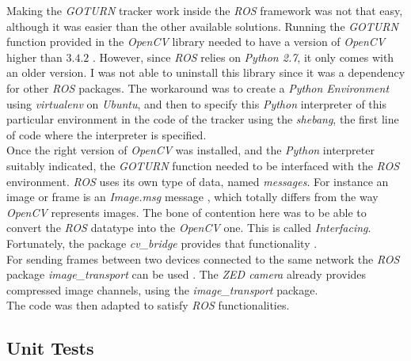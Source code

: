 		Making the \textit{GOTURN} tracker work inside
		the \textit{ROS} framework was not that easy, 
		although it was easier than the other available solutions.
		Running the \textit{GOTURN} function provided 
		in the \textit{OpenCV} library needed 
		to have a version of \textit{OpenCV} higher than $3.4.2$ \cite{learnopencvgoturn}.
		However, since
		\textit{ROS} relies on \textit{Python 2.7}, 
		it only comes with an older version. I was not
		able to uninstall this library since it was
		a dependency for other \textit{ROS} packages. The 
		workaround was to create a \textit{Python Environment}
		using \textit{virtualenv} on \textit{Ubuntu}, and then 
		to specify this \textit{Python} interpreter of this
		particular environment in the code of the tracker
		using the \textit{shebang}, the first line of code
		where the interpreter is specified.
		\\\indent Once the right version of
		\textit{OpenCV} was installed, and the \textit{Python}
		interpreter suitably indicated, the \textit{GOTURN} function
		needed to be interfaced with the \textit{ROS} environment.
		\textit{ROS} uses its own type of data, named \textit{messages}.
		For instance an image or frame is an \textit{Image.msg} message \cite{imagemsg},
		which totally differs from the way \textit{OpenCV}
		represents images.
		The bone of contention here was to be able to 
		convert the \textit{ROS} datatype into the \textit{OpenCV} one.
		This is called \textit{Interfacing}.
		Fortunately, the package \textit{cv\_bridge} provides that 
		functionality \cite{rosdoccvbridge}. 
		\\\indent For sending frames between two devices connected
		to the same network the \textit{ROS} package \textit{image\_transport}
		can be used \cite{rosdoctransport}. The \textit{ZED camera} already
		provides compressed image channels, using the \textit{image\_transport} package.
		\\\indent The code was then adapted to satisfy \textit{ROS}
		functionalities. 

		\subsection{Unit Tests}
		
